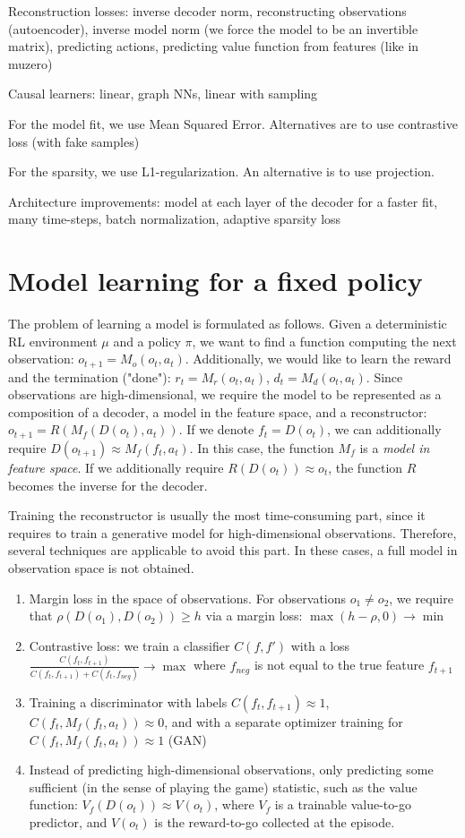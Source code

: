 \documentclass[a4paper,11pt,oneside]{report}
\begin{document}
Reconstruction losses: inverse decoder norm, reconstructing observations (autoencoder), inverse model norm (we force the model to be an invertible matrix), predicting actions, predicting value function from features (like in muzero)

Causal learners: linear, graph NNs, linear with sampling

For the model fit, we use Mean Squared Error. Alternatives are to use contrastive loss (with fake samples)

For the sparsity, we use L1-regularization. An alternative is to use projection.

Architecture improvements: model at each layer of the decoder for a faster fit, many time-steps, batch normalization, adaptive sparsity loss



\section{Model learning for a fixed policy}
The problem of learning a model is formulated as follows. Given a deterministic RL environment $\mu$ and a policy $\pi$, we want to find a function computing the next observation: $o_{t+1}=M_o(o_t, a_t)$. Additionally, we would like to learn the reward and the termination ("done"): $r_t=M_r(o_t, a_t)$, $d_t=M_d(o_t, a_t)$. Since observations are high-dimensional, we require the model to be represented as a composition of a decoder, a model in the feature space, and a reconstructor: $o_{t+1}=R(M_f(D(o_t), a_t))$. If we denote $f_t=D(o_t)$, we can additionally require $D(o_{t+1})\approx M_f(f_t, a_t)$. In this case, the function $M_f$ is a {\em model in feature space}. If we additionally require $R(D(o_t))\approx o_t$, the function $R$ becomes the inverse for the decoder.

Training the reconstructor is usually the most time-consuming part, since it requires to train a generative model for high-dimensional observations. Therefore, several techniques are applicable to avoid this part. In these cases, a full model in observation space is not obtained.
\begin{enumerate}
    \item Margin loss in the space of observations. For observations $o_1\neq o_2$, we require that $\rho(D(o_1), D(o_2))\geq h$ via a margin loss: $\max(h-\rho, 0)\to\min$
    \item Contrastive loss: we train a classifier $C(f, f')$ with a loss $\frac{C(f_t, f_{t+1})}{C(f_t, f_{t+1})+C(f_t, f_{neg})}\to\max$ where $f_{neg}$ is not equal to the true feature $f_{t+1}$
    \item Training a discriminator with labels $C(f_t, f_{t+1})\approx 1$, $C(f_t, M_f(f_t, a_t))\approx 0$, and with a separate optimizer training for $C(f_t, M_f(f_t, a_t))\approx 1$ (GAN)
    \item Instead of predicting high-dimensional observations, only predicting some sufficient (in the sense of playing the game) statistic, such as the value function: $V_f(D(o_t))\approx V(o_t)$, where $V_f$ is a trainable value-to-go predictor, and $V(o_t)$ is the reward-to-go collected at the episode.
\end{enumerate}
\end{document}
